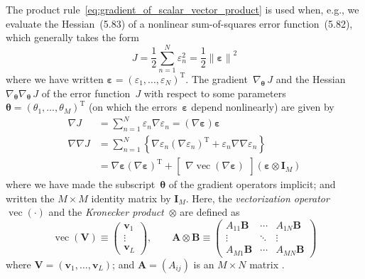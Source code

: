 \documentclass[12pt,a4paper]{article}
\begin{document}
The product rule~\eqref{eq:gradient_of_scalar_vector_product} is used
when, e.g., we evaluate the Hessian~(5.83) of a nonlinear sum-of-squares error function~(5.82),
which generally takes the form
\begin{equation}
J = \frac{1}{2} \sum_{n=1}^{N} \varepsilon_n^{2} = \frac{1}{2} \left\|\bm{\varepsilon}\right\|^2
\end{equation}
where we have written
$\bm{\varepsilon} = \left(\varepsilon_1, \dots, \varepsilon_N\right)^{\operatorname{T}}$.
The gradient~$\nabla_{\bm{\theta}}\, J$ and
the Hessian~$\nabla_{\bm{\theta}}\nabla_{\bm{\theta}}\, J$ of the error function~$J$
with respect to some parameters~$\bm{\theta} =
\left( \theta_1, \dots, \theta_M \right)^{\operatorname{T}}$
(on which the errors~$\bm{\varepsilon}$ depend nonlinearly)
are given by
\begin{align}
\nabla J &= \sum_{n=1}^{N} \varepsilon_n \nabla \varepsilon_n
= \left( \nabla \bm{\varepsilon} \right) \bm{\varepsilon} \\
\nabla\nabla J &=
\sum_{n=1}^{N}
\left\{
\nabla \varepsilon_n
\left(\nabla \varepsilon_n\right)^{\operatorname{T}}
+ \varepsilon_n \nabla\nabla \varepsilon_n
\right\}
\\
&= \nabla \bm{\varepsilon}
\left( \nabla \bm{\varepsilon} \right)^{\operatorname{T}}
+
\begin{bmatrix}
\nabla \operatorname{vec}\left(\nabla \bm{\varepsilon}\right)
\end{bmatrix}
\left( \bm{\varepsilon} \otimes \mathbf{I}_M \right)
\label{eq:vector_form_of_Hessian_of_nonlinear_sum_of_squares_error_function}
\end{align}
where we have made the subscript~$\bm{\theta}$ of the gradient operators implicit;
and written the $M \times M$ identity matrix by $\mathbf{I}_M$.
Here, the \emph{vectorization operator}~$\operatorname{vec}(\cdot)$ and
the \emph{Kronecker product}~$\otimes$ are defined as
\begin{equation}
\operatorname{vec}\left(\mathbf{V}\right) \equiv
\begin{pmatrix}
\mathbf{v}_1 \\
\vdots \\
\mathbf{v}_L
\end{pmatrix} ,
\qquad
\mathbf{A} \otimes \mathbf{B} \equiv
\begin{pmatrix}
A_{11} \mathbf{B} & \cdots & A_{1N} \mathbf{B} \\
\vdots & \ddots & \vdots \\
A_{M1} \mathbf{B} & \cdots & A_{MN} \mathbf{B}
\end{pmatrix}
\end{equation}
where $\mathbf{V} = \left(\mathbf{v}_1, \dots, \mathbf{v}_L \right)$;
and $\mathbf{A} = \left(A_{ij}\right)$ is an $M \times N$ matrix
\citep{MagnusNeudecker:MDC}.
\end{document}
